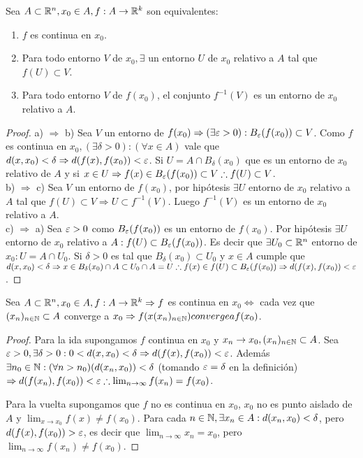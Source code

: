 \begin{prop}
  Sea $A \subset \mathbb{R}^n, x_0 \in A, f: A \to \mathbb{R}^k$ son equivalentes:
  \begin{enumerate}
    \item $f$ es continua en $x_0$.
    \item Para todo entorno $V$ de $x_0, \exists$ un entorno $U$ de $x_0$ relativo a $A$ tal que $f(U) \subset V$.
    \item Para todo entorno $V$ de $f(x_0)$, el conjunto $f^{-1}(V)$ es un entorno de $x_0$ relativo a $A$.
  \end{enumerate}

  \begin{proof}
    a) $\Rightarrow$ b) Sea $V$ un entorno de $f(x_0) \Rightarrow (\exists \varepsilon > 0) : B_{\varepsilon}(f(x_0)) \subset V$. Como $f$ es continua en $x_0, (\exists \delta > 0) : (\forall x \in A)$ vale que $d(x, x_0) < \delta \Rightarrow d(f(x), f(x_0)) < \varepsilon$. Si $U = A \cap B_{\delta}(x_0)$ que es un entorno de $x_0$ relativo de $A$ y si $x \in U \Rightarrow f(x) \in B_{\varepsilon}(f(x_0)) \subset V \therefore f(U) \subset V$. \\
    b) $\Rightarrow$ c) Sea $V$ un entorno de $f(x_0)$, por hipótesis $\exists U$ entorno de $x_0$ relativo a $A$ tal que $f(U) \subset V \Rightarrow U \subset f^{-1}(V)$. Luego $f^{-1}(V)$ es un entorno de $x_0$ relativo a $A$. \\
    c) $\Rightarrow$ a) Sea $\varepsilon > 0$ como $B_{\varepsilon}(f(x_0))$ es un entorno de $f(x_0)$. Por hipótesis $\exists U$ entorno de $x_0$ relativo a $A : f(U) \subset B_{\varepsilon}(f(x_0))$. Es decir que $\exists U_0 \subset \mathbb{R}^n$ entorno de $x_0 : U = A \cap U_0$. Si $\delta > 0$ es tal que $B_{\delta}(x_0) \subset U_0$ y $x \in A$ cumple que $d(x, x_0) < \delta \Rightarrow x \in B_{\delta}(x_0) \cap A \subset U_0 \cap A = U \therefore f(x) \in f(U) \subset B_{\varepsilon}(f(x_0))  \Rightarrow d(f(x), f(x_0)) < \varepsilon$.
  \end{proof}
\end{prop}

\begin{prop}
  Sea $A \subset \mathbb{R}^n, x_0 \in A, f: A \to \mathbb{R}^k \Rightarrow f$ es continua en $x_0 \iff$ cada vez que $(x_n)_{n \in \mathbb{N}} \subset A$ converge a $x_0 \Rightarrow f(x(x_n)_{n \in \mathbb{N}}) converge a f(x_0)$.
  \begin{proof}
    Para la ida supongamos $f$ continua en $x_0$ y $x_n \to x_0, (x_n)_{n \in \mathbb{N}} \subset A$. Sea $\varepsilon > 0, \exists \delta > 0 : 0 < d(x, x_0) < \delta \Rightarrow d(f(x), f(x_0)) < \varepsilon$.
    Además $\exists n_0 \in \mathbb{N} : (\forall n > n_0)(d(x_n, x_0)) < \delta$ (tomando $\varepsilon = \delta$ en la definición) $\Rightarrow d(f(x_n), f(x_0)) < \varepsilon \therefore \lim_{n \to \infty} f(x_n) = f(x_0)$.

    Para la vuelta supongamos que $f$ no es continua en $x_0$, $x_0$ no es punto aislado de $A$ y $\lim_{x \to x_0} f(x) \neq f(x_0)$. Para cada $n \in \mathbb{N}, \exists x_n \in A : d(x_n, x_0) < \delta$, pero $d(f(x), f(x_0)) > \varepsilon$, es decir que $\lim_{n \to \infty} x_n = x_0$, pero $\lim_{n \to \infty} f(x_n) \neq f(x_0)$.
  \end{proof}
\end{prop}

